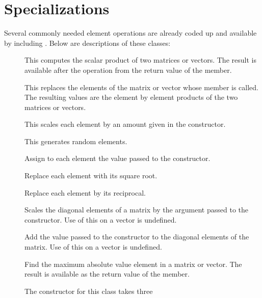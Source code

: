 




\section{ Specializations}

Several commonly needed element operations are already coded
up and available by including .
Below are descriptions of these classes:

\begin{description}
\item[] This  computes
the scalar product of two matrices or vectors.  The result is available
after the operation from the return value of the  member.
\item[] This 
replaces the elements of the matrix or vector whose 
member is called.  The resulting values are the element by element products
of the two matrices or vectors.
\item[] This scales each element by an amount given
in the constructor.
\item[] This generates random elements.
\item[] Assign to each element the value passed to
the constructor.
\item[] Replace each element with its square
root.
\item[] Replace each element by its reciprocal.
\item[] Scales the diagonal elements of a
matrix by the argument passed to the constructor.  Use of this on a vector
is undefined.
\item[] Add the value passed to the
constructor to the diagonal elements of the matrix.  Use of this on a
vector is undefined.
\item[] Find the maximum absolute value element in a
matrix or vector.  The result is available as the return value of the
 member.
\item[] The constructor for this class takes three

\end{description}
